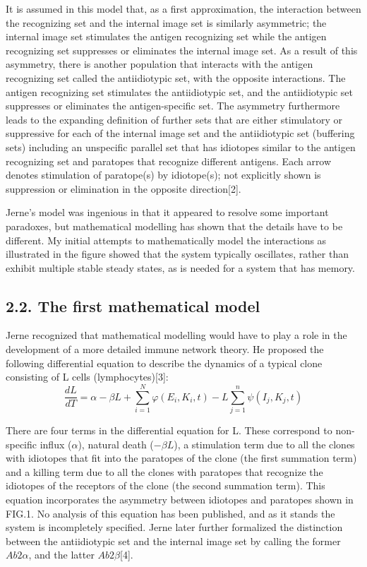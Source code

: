 \documentclass[Proceedings]{ascelike}
\begin{document}
It is assumed in this model that, as a first approximation, the interaction between the recognizing set and the internal image set is similarly asymmetric; the internal image set stimulates the antigen recognizing set while the antigen recognizing set suppresses or eliminates the internal image set. As a result of this asymmetry, there is another population that interacts with the antigen recognizing set called the antiidiotypic set, with the opposite interactions. The antigen recognizing set stimulates the antiidiotypic set, and the antiidiotypic set suppresses or eliminates the antigen-specific set. The asymmetry furthermore leads to the expanding definition of further sets that are either stimulatory or suppressive for each of the internal image set and the antiidiotypic set (buffering sets) including an unspecific parallel set that has idiotopes similar to the antigen recognizing set and paratopes that recognize different antigens. Each arrow denotes stimulation of paratope(s) by idiotope(s); not explicitly shown is suppression or elimination in the opposite direction[2].
\par
Jerne’s model was ingenious in that it appeared to resolve some important paradoxes, but mathematical modelling has shown that the details have to be different. My initial attempts to mathematically model the interactions as illustrated in the figure showed that the system typically oscillates, rather than exhibit multiple stable steady states, as is needed for a system that has memory.
 
\subsection{2.2. The first mathematical model}
Jerne recognized that mathematical modelling would have to play a role in the development of a more detailed immune network theory. He proposed the following differential equation to describe the dynamics of a typical clone consisting of L cells (lymphocytes)[3]:
\begin{equation}{
    \frac{dL}{dT}= \alpha -\beta L+\sum_{i=1}^{N}\varphi (E_{i},K_{i},t)-L\sum_{j=1}^{n}\psi (I_{j},K_{j},t)}
\end{equation}
\par
There are four terms in the differential equation for L. These correspond to non-specific influx (\boldmath$\alpha$), natural death (\boldmath$-\beta L$), a stimulation term due to all the clones with idiotopes that fit into the paratopes of the clone (the first summation term) and a killing term due to all the clones with paratopes that recognize the idiotopes of the receptors of the clone (the second summation term). This equation incorporates the asymmetry between idiotopes and paratopes shown in FIG.1. No analysis of this equation has been published, and as it stands the system is incompletely specified. Jerne later further formalized the distinction between the antiidiotypic set and the internal image set by calling the former \boldmath$Ab2\alpha$, and the latter \boldmath$Ab2\beta$[4]. 
\end{document}
